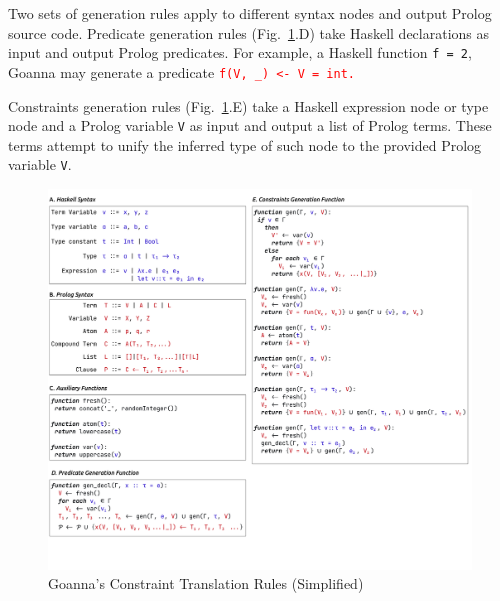     Two sets of generation rules apply to different syntax nodes and output Prolog source code. Predicate generation rules (Fig.~\ref{fig:translation}.D) take Haskell declarations as input and output Prolog predicates. For example, a Haskell function \texttt{f = 2}, Goanna may generate a predicate \texttt{\textcolor{red}{f(V, \_) <- V = int.}}
    
    Constraints generation rules (Fig.~\ref{fig:translation}.E) take a Haskell expression node or type node and a Prolog variable \texttt{V} as input and output a list of Prolog terms. These terms attempt to unify the inferred type of such node to the provided Prolog variable \texttt{V}.
    
    \begin{figure}[htb!]
        \centering
        \includegraphics[width=\linewidth]{images/Generation}
        \caption{Goanna's Constraint Translation Rules (Simplified)} 
        \label{fig:translation}
    \end{figure}
    



